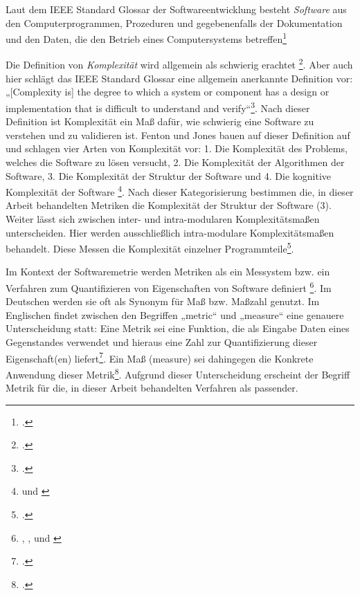 Laut dem \ac{IEEE} Standard Glossar der Softwareentwicklung besteht
\emph{Software} aus den Computerprogrammen, Prozeduren und
gegebenenfalls der Dokumentation und den Daten, die den Betrieb eines
Computersystems betreffen\footcite[Vgl. ][S. 66]{IEEEStandardGlossary}

Die Definition von \emph{Komplexität} wird allgemein als schwierig
erachtet \footcite[Vgl. ][S. 335 und 627]{jonesAppliedSoftwareMeasurement2008}.
Aber auch hier schlägt das \ac{IEEE} Standard Glossar eine allgemein
anerkannte Definition vor: „{[}Complexity is{]} the degree to which a
system or component has a design or implementation that is difficult to
understand and verify``\footcite[Vgl. ][S. 18]{IEEEStandardGlossary}. Nach dieser
Definition ist Komplexität ein Maß dafür, wie schwierig eine Software zu
verstehen und zu validieren ist. Fenton und Jones bauen auf dieser
Definition auf und schlagen vier Arten von Komplexität vor: 1. Die
Komplexität des Problems, welches die Software zu lösen versucht, 2. Die
Komplexität der Algorithmen der Software, 3. Die Komplexität der
Struktur der Software und 4. Die kognitive Komplexität der
Software \footnote{\cite[Vgl. ][S. 258]{fentonSoftwareMetricsRigorous2003} und \cite[][S. 449]{jonesAppliedSoftwareMeasurement2008}}. Nach dieser Kategorisierung bestimmen die, in dieser
Arbeit behandelten Metriken die Komplexität der Struktur der Software
(3). Weiter lässt sich zwischen inter- und intra-modularen
Komplexitätsmaßen unterscheiden. Hier werden ausschließlich
intra-modulare Komplexitätsmaßen behandelt. Diese Messen die Komplexität
einzelner Programmteile\footcite[Vgl. ][S. 7ff]{zuseSoftwareComplexityMeasures1991}.

Im Kontext der Softwaremetrie werden Metriken als ein Messystem bzw. ein
Verfahren zum Quantifizieren von Eigenschaften von Software
definiert \footnote{\cite[Vgl. ][S. 35ff]{dumkeTheorieUndPraxis1994}, \cite[][S. 4ff]{ebertSoftwareMetrikenPraxisEinfuhrung1996}, \cite[][]{augstenWasSindSoftwaremetriken} und \cite[][S. 2f]{IEEEStandardSoftware}}. Im Deutschen werden sie oft als Synonym für Maß bzw. Maßzahl
genutzt. Im Englischen findet zwischen den Begriffen „metric`` und
„measure`` eine genauere Unterscheidung statt: Eine Metrik sei eine
Funktion, die als Eingabe Daten eines Gegenstandes verwendet und hieraus
eine Zahl zur Quantifizierung dieser Eigenschaft(en) liefert\footcite[Vgl. ][S. 3]{IEEEStandardSoftware}. Ein Maß (measure) sei dahingegen die Konkrete Anwendung dieser
Metrik\footcite[Vgl. ][S. 2]{IEEEStandardSoftware}. Aufgrund dieser
Unterscheidung erscheint der Begriff Metrik für die, in dieser Arbeit
behandelten Verfahren als passender.

